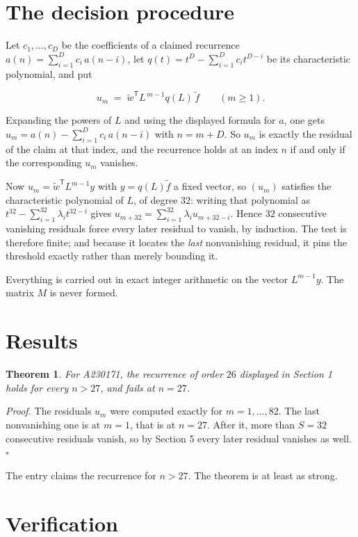 \documentclass[11pt]{article}
\newtheorem{theorem}{Theorem}
\theoremstyle{definition}
\begin{document}
\section{The decision procedure}

Let $c_1,\dots,c_D$ be the coefficients of a claimed recurrence $a(n) = \sum_{i=1}^{D} c_i\,a(n-i)$, let $q(t) = t^{D} - \sum_{i=1}^{D} c_i t^{D-i}$ be its characteristic polynomial, and put

\[u_m \;=\; \tilde w^{\mathsf T} L^{\,m-1} q(L)\,\tilde f \qquad (m \ge 1).\]

Expanding the powers of $L$ and using the displayed formula for $a$, one gets $u_m = a(n) - \sum_{i=1}^{D} c_i\,a(n-i)$ with $n = m + D$. So $u_m$ is exactly the residual of the claim at that index, and the recurrence holds at an index $n$ if and only if the corresponding $u_m$ vanishes.

Now $u_m = \tilde w^{\mathsf T} L^{m-1} y$ with $y = q(L)\tilde f$ a fixed vector, so $(u_m)$ satisfies the characteristic polynomial of $L$, of degree $32$: writing that polynomial as $t^{32} - \sum_{i=1}^{32} \lambda_i t^{32-i}$ gives $u_{m+32} = \sum_{i=1}^{32} \lambda_i u_{m+32-i}$. Hence $32$ consecutive vanishing residuals force every later residual to vanish, by induction. The test is therefore finite; and because it locates the {\itshape last} nonvanishing residual, it pins the threshold exactly rather than merely bounding it.

Everything is carried out in exact integer arithmetic on the vector $L^{m-1}y$. The matrix $M$ is never formed.

\section{Results}

\begin{theorem} For A230171, the recurrence of order $26$ displayed in Section 1 holds for every $n > 27$, and fails at $n = 27$.\end{theorem}

{\itshape Proof.} The residuals $u_m$ were computed exactly for $m = 1,\dots,82$. The last nonvanishing one is at $m = 1$, that is at $n = 27$. After it, more than $S = 32$ consecutive residuals vanish, so by Section 5 every later residual vanishes as well. $\square$

The entry claims the recurrence for $n > 27$. The theorem is at least as strong.

\section{Verification}
\end{document}
